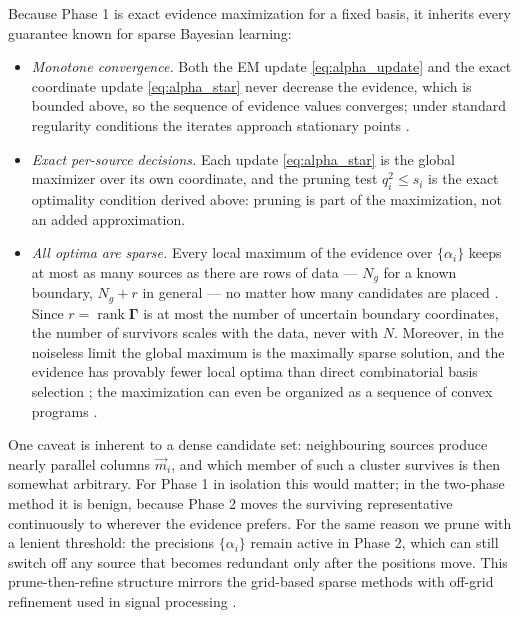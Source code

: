 \documentclass{article}
\begin{document}
Because Phase 1 is exact evidence maximization for a fixed basis, it inherits every guarantee known for sparse Bayesian learning:
\begin{itemize}
    \item \emph{Monotone convergence.} Both the EM update \eqref{eq:alpha_update} and the exact coordinate update \eqref{eq:alpha_star} never decrease the evidence, which is bounded above, so the sequence of evidence values converges; under standard regularity conditions the iterates approach stationary points \cite{wu1983convergence,faul2002analysis,tipping2003fast}.
    \item \emph{Exact per-source decisions.} Each update \eqref{eq:alpha_star} is the global maximizer over its own coordinate, and the pruning test $q_i^2 \le s_i$ is the exact optimality condition derived above: pruning is part of the maximization, not an added approximation.
    \item \emph{All optima are sparse.} Every local maximum of the evidence over $\{\alpha_i\}$ keeps at most as many sources as there are rows of data --- $N_g$ for a known boundary, $N_g + r$ in general --- no matter how many candidates are placed \cite{wipf2004sparse}. Since $r = \operatorname{rank}\mathbf\Gamma$ is at most the number of uncertain boundary coordinates, the number of survivors scales with the data, never with $N$. Moreover, in the noiseless limit the global maximum is the maximally sparse solution, and the evidence has provably fewer local optima than direct combinatorial basis selection \cite{wipf2004sparse}; the maximization can even be organized as a sequence of convex programs \cite{wipf2008new}.
\end{itemize}
One caveat is inherent to a dense candidate set: neighbouring sources produce nearly parallel columns $\vec m_i$, and which member of such a cluster survives is then somewhat arbitrary. For Phase 1 in isolation this would matter; in the two-phase method it is benign, because Phase 2 moves the surviving representative continuously to wherever the evidence prefers. For the same reason we prune with a lenient threshold: the precisions $\{\alpha_i\}$ remain active in Phase 2, which can still switch off any source that becomes redundant only after the positions move. This prune-then-refine structure mirrors the grid-based sparse methods with off-grid refinement used in signal processing \cite{yang2013offgrid}.
\end{document}
